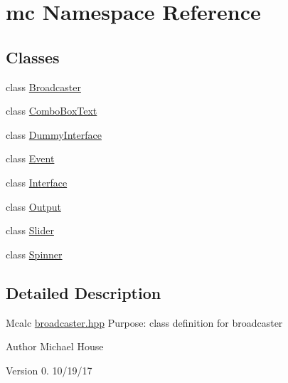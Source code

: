 \hypertarget{namespacemc}{}\section{mc Namespace Reference}
\label{namespacemc}
\subsection*{Classes}
\begin{DoxyCompactItemize}
\item 
class \hyperlink{classmc_1_1Broadcaster}{Broadcaster}
\item 
class \hyperlink{classmc_1_1ComboBoxText}{Combo\+Box\+Text}
\item 
class \hyperlink{classmc_1_1DummyInterface}{Dummy\+Interface}
\item 
class \hyperlink{classmc_1_1Event}{Event}
\item 
class \hyperlink{classmc_1_1Interface}{Interface}
\item 
class \hyperlink{classmc_1_1Output}{Output}
\item 
class \hyperlink{classmc_1_1Slider}{Slider}
\item 
class \hyperlink{classmc_1_1Spinner}{Spinner}
\end{DoxyCompactItemize}


\subsection{Detailed Description}
Mcalc \hyperlink{broadcaster_8hpp_source}{broadcaster.\+hpp} Purpose\+: class definition for broadcaster

\begin{DoxyAuthor}{Author}
Michael House 
\end{DoxyAuthor}
\begin{DoxyVersion}{Version}
0. 10/19/17 
\end{DoxyVersion}
